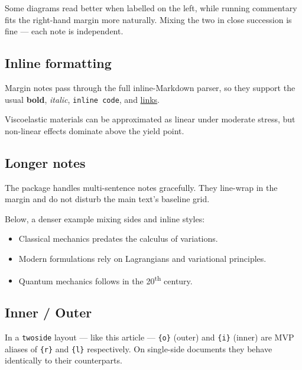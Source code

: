 \documentclass[a4paper,twoside]{article}
\begin{document}
Some diagrams read better when labelled on the left{\reversemarginpar{}}, while running commentary fits the right-hand
margin more naturally. Mixing the two in
close succession is fine --- each note is independent.

\subsection{Inline formatting}\label{inline-formatting}

Margin notes pass through the full inline-Markdown parser, so they support
the usual \textbf{bold}, \emph{italic}, \texttt{inline code}, and \href{https://example.org}{links}.

Viscoelastic materials can be approximated as linear under moderate stress, but non-linear effects dominate above the
yield point.

\subsection{Longer notes}\label{longer-notes}

The package handles multi-sentence notes gracefully. They line-wrap in the
margin and do not disturb the main text's baseline
grid.

Below, a denser example mixing sides and inline styles:

\begin{itemize}
\item{} Classical mechanics{\reversemarginpar{}} predates
  the calculus of variations.
\item{} Modern formulations rely on Lagrangians and variational principles.
\item{} Quantum mechanics follows in the 20\textsuperscript{th} century.

\end{itemize}
\subsection{Inner / Outer}\label{inner-outer}

In a \texttt{twoside} layout --- like this article --- \texttt{\{o\}} (outer) and \texttt{\{i\}} (inner)
are MVP aliases of \texttt{\{r\}} and \texttt{\{l\}} respectively. On single-side documents
they behave identically to their counterparts.
\end{document}
